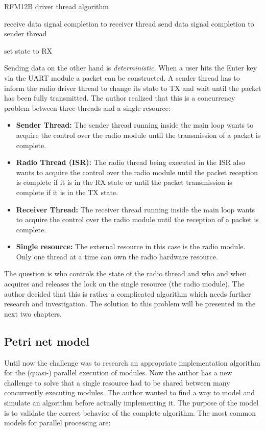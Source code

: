 \begin{algorithm}[H]
\caption{RFM12B driver thread algorithm}
\label{alg:rfm12b_thread}
\begin{algorithmic}
        \STATE receive data
        \STATE signal completion to receiver thread
        \STATE send data
        \STATE signal completion to sender thread
    \ENDIF

    \STATE set state to RX
\ENDWHILE
\end{algorithmic}
\end{algorithm}

Sending data on the other hand is \emph{deterministic}. When a user hits the Enter key via the UART module a packet can be constructed. A sender thread has to inform the radio driver thread to change its state to TX and wait until the packet has been fully transmitted. The author realized that this is a concurrency problem between three threads and a single resource:

\begin{itemize}
    \item \textbf{Sender Thread:} The sender thread running inside the main loop wants to acquire the control over the radio module until the transmission of a packet is complete.
    \item \textbf{Radio Thread (ISR):} The radio thread being executed in the ISR also wants to acquire the control over the radio module until the packet reception is complete if it is in the RX state or until the packet transmission is complete if it is in the TX state.
    \item \textbf{Receiver Thread:} The receiver thread running inside the main loop wants to acquire the control over the radio module until the reception of a packet is complete.
    \item \textbf{Single resource:} The external resource in this case is the radio module. Only one thread at a time can own the radio hardware resource.
\end{itemize}

The question is who controls the state of the radio thread and who and when acquires and releases the lock on the single resource (the radio module). The author decided that this is rather a complicated algorithm which needs further research and investigation. The solution to this problem will be presented in the next two chapters.

\subsection{Petri net model}%
Until now the challenge was to research an appropriate implementation algorithm for the (quasi-) parallel execution of modules. Now the author has a new challenge to solve that a single resource had to be shared between many concurrently executing modules. The author wanted to find a way to model and simulate an algorithm before actually implementing it. The purpose of the model is to validate the correct behavior of the complete algorithm. The most common models for parallel processing are:

